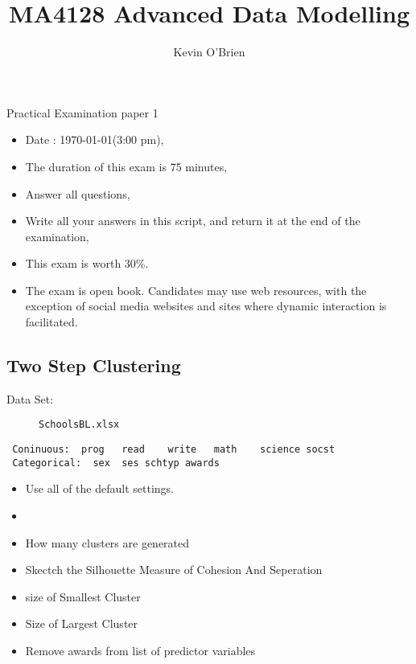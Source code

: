 \documentclass[12pt, a4paper]{article}
\author{ }
\theoremstyle{plain}
\theoremstyle{definition}
\theoremstyle{remark}
\begin{document}
\author{Kevin O'Brien}
\title{MA4128 Advanced Data Modelling}
\maketitle


{\Large
Practical Examination paper 1
}
\begin{itemize}
\item Date : \today     (3:00 pm),
\item The duration of this exam is 75 minutes,
\item Answer all questions,
\item Write all your answers in this script, and return it at the end of the examination,
\item This exam is worth 30\%.
\item The exam is open book. Candidates may use web resources, with the exception of social media websites and sites where dynamic interaction is facilitated.
\end{itemize}
\tableofcontents
\newpage


\subsection{Two Step Clustering}

\begin{description}
\item[Data Set:] \texttt{SchoolsBL.xlsx}
\end{description}

\begin{framed}
\begin{verbatim}
 Coninuous:  prog	read	write	math	science	socst
 Categorical:  sex	ses	schtyp awards
\end{verbatim}
\end{framed}
\begin{itemize}
\item Use all of the default settings.
\end{itemize}


\begin{itemize}
\item 
\item How many clusters are generated
\item 
Skectch the Silhouette  Measure of Cohesion And Seperation
\item 
size of Smallest Cluster
\item 
Size of Largest Cluster
\item 
Remove awards from list of predictor variables
\end{itemize}
\newpage
\end{document}
